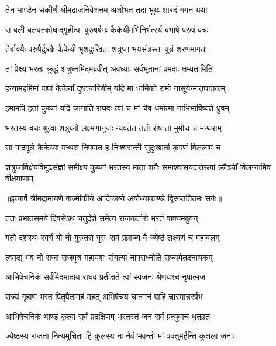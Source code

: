 \twolineshloka
{तेन भाण्डेन संकीर्णं श्रीमद्राजनिवेशनम्}
{अशोभत तदा भूयः शारदं गगनं यथा} %

\twolineshloka
{स बली बलवत्क्रोधाद्गृहीत्वा पुरुषर्षभः}
{कैकेयीमभिनिर्भर्त्स्य बभाषे परुषं वचः} %

\twolineshloka
{तैर्वाक्यैः परुषैर्दुःखैः कैकेयी भृशदुःखिता}
{शत्रुघ्न भयसंत्रस्ता पुत्रं शरणमागता} %

\twolineshloka
{तां प्रेक्ष्य भरतः क्रुद्धं शत्रुघ्नमिदमब्रवीत्}
{अवध्याः सर्वभूतानां प्रमदाः क्षम्यतामिति} %

\twolineshloka
{हन्यामहमिमां पापां कैकेयीं दुष्टचारिणीम्}
{यदि मां धार्मिको रामो नासूयेन्मातृघातकम्} %

\twolineshloka
{इमामपि हतां कुब्जां यदि जानाति राघवः}
{त्वां च मां चैव धर्मात्मा नाभिभाषिष्यते ध्रुवम्} %

\twolineshloka
{भरतस्य वचः श्रुत्वा शत्रुघ्नो लक्ष्मणानुजः}
{न्यवर्तत ततो रोषात्तां मुमोच च मन्थराम्} %

\twolineshloka
{सा पादमूले कैकेय्या मन्थरा निपपात ह}
{निःश्वसन्ती सुदुःखार्ता कृपणं विललाप च} %

\fourlineindentedshloka
{शत्रुघ्नविक्षेपविमूढसंज्ञां}
{ समीक्ष्य कुब्जां भरतस्य माता}
{शनैः समाश्वासयदार्तरूपां}
{ क्रौञ्चीं विलग्नामिव वीक्षमाणाम्} %


{॥इत्यार्षे श्रीमद्रामायणे वाल्मीकीये आदिकाव्ये अयोध्याकाण्डे द्विसप्ततितमः सर्गः॥}


\twolineshloka
{ततः प्रभातसमये दिवसेऽथ चतुर्दशे}
{समेत्य राजकर्तारो भरतं वाक्यमब्रुवन्} %

\twolineshloka
{गतो दशरथः स्वर्गं यो नो गुरुतरो गुरुः}
{रामं प्रव्राज्य वै ज्येष्ठं लक्ष्मणं च महाबलम्} %

\twolineshloka
{त्वमद्य भव नो राजा राजपुत्र महायशः}
{संगत्या नापराध्नोति राज्यमेतदनायकम्} %

\twolineshloka
{आभिषेचनिकं सर्वमिदमादाय राघव}
{प्रतीक्षते त्वां स्वजनः श्रेणयश्च नृपात्मज} %

\twolineshloka
{राज्यं गृहाण भरत पितृपैतामहं महत्}
{अभिषेचय चात्मानं पाहि चास्मान्नरर्षभ} %

\twolineshloka
{आभिषेचनिकं भाण्डं कृत्वा सर्वं प्रदक्षिणम्}
{भरतस्तं जनं सर्वं प्रत्युवाच धृतव्रतः} %

\twolineshloka
{ज्येष्ठस्य राजता नित्यमुचिता हि कुलस्य नः}
{नैवं भवन्तो मां वक्तुमर्हन्ति कुशला जनाः} %

